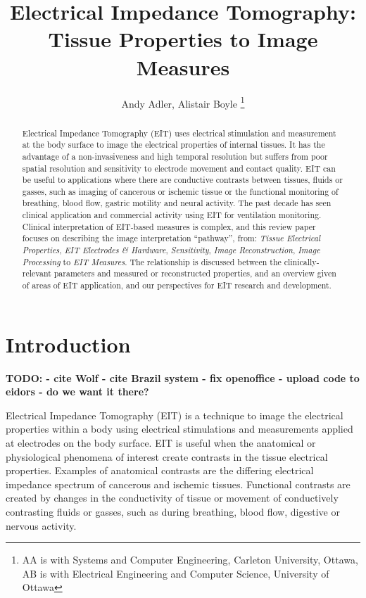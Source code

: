 \documentclass[12pt]{article} \usepackage[margin=3cm]{geometry} \usepackage[margin=20pt,font=small,labelfont=bf]{caption}\def\TBLWIDA{35mm}\def\TBLWIDB{95mm}
\newcommand{\TODO}[1]{{\bf TODO: #1}}
\begin{document}
\title{Electrical Impedance Tomography:\\ Tissue Properties to Image Measures}
\author{Andy Adler, Alistair Boyle
\thanks{AA is with Systems and Computer Engineering, Carleton University, Ottawa, AB is with Electrical Engineering and Computer Science, University of Ottawa}
}
\date{}
\maketitle

\begin{abstract}
Electrical Impedance Tomography (EIT) uses electrical
stimulation and measurement at the body surface to
image the electrical properties of internal tissues.
It has the advantage of a non-invasiveness and
high temporal resolution but suffers from poor spatial
resolution and sensitivity to electrode movement and
contact quality.
EIT can be useful to applications where there are conductive contrasts between
tissues, fluids or gasses, such as imaging of cancerous
or ischemic tissue or the functional monitoring
of breathing, blood flow, gastric motility
and neural activity.
The past decade has seen clinical application and commercial
activity using EIT for ventilation monitoring.
Clinical interpretation of EIT-based measures is complex, and
this review paper focuses on 
describing the image interpretation ``pathway'', from:
{\em Tissue Electrical Properties},
{\em EIT Electrodes \& Hardware},
{\em Sensitivity},
{\em Image Reconstruction},
{\em Image Processing}
to 
{\em EIT Measures}.
The relationship is discussed between the 
clinically-relevant parameters and measured or
reconstructed properties, and 
an overview given of areas of EIT application,
and our perspectives for
EIT research and development.
\end{abstract}


\section{Introduction}
\TODO{
  - cite Wolf
  - cite Brazil system
  - fix openoffice
  - upload code to eidors - do we want it there?
}

Electrical Impedance Tomography (EIT) is a technique to 
image the electrical properties within a body using
electrical stimulations and measurements applied at electrodes
on the body surface.
EIT is useful when the
anatomical or physiological phenomena of interest
create contrasts in the tissue electrical properties.
Examples of anatomical contrasts are 
the differing electrical impedance spectrum of
cancerous \cite{Jossinet1998Breast} and
ischemic \cite{Packham2012Frequency} tissues.
Functional contrasts are created by changes
in the conductivity of tissue or movement of
conductively contrasting fluids or gasses, such as during
breathing, blood flow, digestive or nervous activity.
\end{document}
